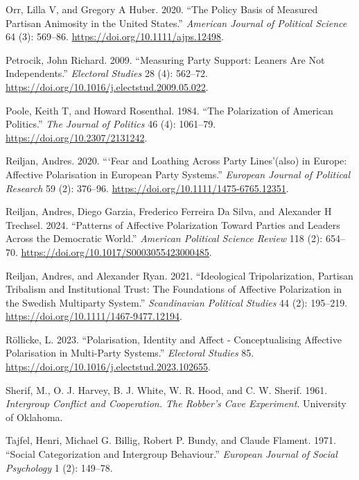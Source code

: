 \documentclass[
  12pt,
  a4paper,
  DIV=11,
  numbers=noendperiod]{scrartcl}
\newlength{\cslhangindent}
\newenvironment{CSLReferences}[2] %
 {\begin{list}{}{%
  \setlength{\itemindent}{0pt}
  \setlength{\leftmargin}{0pt}
  \setlength{\parsep}{0pt}
  \ifodd #1
   \setlength{\leftmargin}{\cslhangindent}
   \setlength{\itemindent}{-1\cslhangindent}
  \fi
  \setlength{\itemsep}{#2\baselineskip}}}
 {\end{list}}
\begin{document}
\begin{CSLReferences}{1}{0}
Orr, Lilla V, and Gregory A Huber. 2020. {``The Policy Basis of Measured
Partisan Animosity in the United States.''} \emph{American Journal of
Political Science} 64 (3): 569--86.
\url{https://doi.org/10.1111/ajps.12498}.

Petrocik, John Richard. 2009. {``Measuring Party Support: Leaners Are
Not Independents.''} \emph{Electoral Studies} 28 (4): 562--72.
\url{https://doi.org/10.1016/j.electstud.2009.05.022}.

Poole, Keith T, and Howard Rosenthal. 1984. {``The Polarization of
American Politics.''} \emph{The Journal of Politics} 46 (4): 1061--79.
\url{https://doi.org/10.2307/2131242}.

Reiljan, Andres. 2020. {``{`Fear and Loathing Across Party Lines'}(also)
in Europe: Affective Polarisation in European Party Systems.''}
\emph{European Journal of Political Research} 59 (2): 376--96.
\url{https://doi.org/10.1111/1475-6765.12351}.

Reiljan, Andres, Diego Garzia, Frederico Ferreira Da Silva, and
Alexander H Trechsel. 2024. {``Patterns of Affective Polarization Toward
Parties and Leaders Across the Democratic World.''} \emph{American
Political Science Review} 118 (2): 654--70.
\url{https://doi.org/10.1017/S0003055423000485}.

Reiljan, Andres, and Alexander Ryan. 2021. {``Ideological
Tripolarization, Partisan Tribalism and Institutional Trust: The
Foundations of Affective Polarization in the Swedish Multiparty
System.''} \emph{Scandinavian Political Studies} 44 (2): 195--219.
\url{https://doi.org/10.1111/1467-9477.12194}.

Röllicke, L. 2023. {``Polarisation, Identity and Affect -
Conceptualising Affective Polarisation in Multi-Party Systems.''}
\emph{Electoral Studies} 85.
\url{https://doi.org/10.1016/j.electstud.2023.102655}.

Sherif, M., O. J. Harvey, B. J. White, W. R. Hood, and C. W. Sherif.
1961. \emph{{Intergroup Conflict and Cooperation. The Robber's Cave
Experiment}}. University of Oklahoma.

Tajfel, Henri, Michael G. Billig, Robert P. Bundy, and Claude Flament.
1971. {``Social Categorization and Intergroup Behaviour.''}
\emph{European Journal of Social Psychology} 1 (2): 149--78.


\end{CSLReferences}
\end{document}
